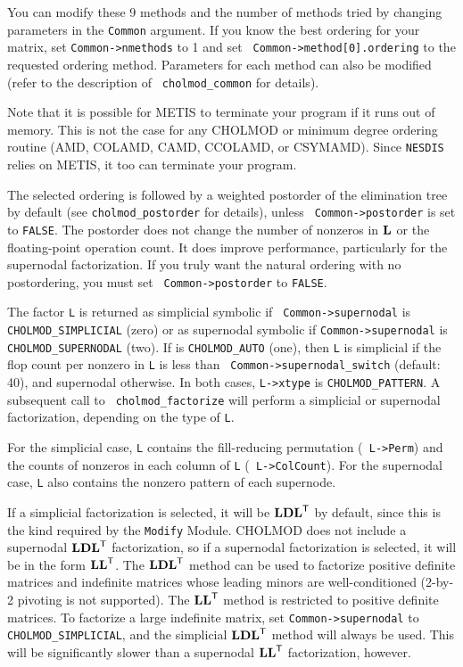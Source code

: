 \documentclass[11pt]{article}
\newcommand{\m}[1]{{\bf{#1}}}       %
\newcommand{\tr}{^{\sf T}}          %
\begin{document}
You can modify these 9 methods and the number of methods tried by changing
parameters in the {\tt Common} argument.  If you know the best ordering for
your matrix, set {\tt Common->nmethods} to 1 and set {\tt
Common->method[0].ordering} to the requested ordering method.  Parameters for
each method can also be modified (refer to the description of {\tt
cholmod\_common} for details).

Note that it is possible for METIS to terminate your program if it runs out of
memory.  This is not the case for any CHOLMOD or minimum degree ordering
routine (AMD, COLAMD, CAMD, CCOLAMD, or CSYMAMD).  Since {\tt NESDIS} relies on
METIS, it too can terminate your program.

The selected ordering is followed by a weighted postorder of the elimination
tree by default (see {\tt cholmod\_postorder} for details), unless {\tt
Common->postorder} is set to {\tt FALSE}.  The postorder does not change the
number of nonzeros in $\m{L}$ or the floating-point operation count.  It does
improve performance, particularly for the supernodal factorization.  If you
truly want the natural ordering with no postordering, you must set {\tt
Common->postorder} to {\tt FALSE}.

The factor {\tt L} is returned as simplicial symbolic if {\tt
Common->supernodal} is {\tt CHOLMOD\_SIMPLICIAL} (zero) or as supernodal
symbolic if {\tt Common->supernodal} is {\tt CHOLMOD\_SUPERNODAL} (two).  If
 is {\tt CHOLMOD\_AUTO} (one), then {\tt L} is
simplicial if the flop count per nonzero in {\tt L} is less than {\tt
Common->supernodal\_switch} (default: 40), and supernodal otherwise.  In both
cases, {\tt L->xtype} is {\tt CHOLMOD\_PATTERN}.  A subsequent call to {\tt
cholmod\_factorize} will perform a simplicial or supernodal factorization,
depending on the type of {\tt L}.

For the simplicial case, {\tt L} contains the fill-reducing permutation ({\tt
L->Perm}) and the counts of nonzeros in each column of {\tt L} ({\tt
L->ColCount}).  For the supernodal case, {\tt L} also contains the nonzero
pattern of each supernode.

If a simplicial factorization is selected, it will be $\m{LDL}\tr$ by default,
since this is the kind required by the {\tt Modify} Module.  CHOLMOD does not
include a supernodal $\m{LDL}\tr$ factorization, so if a supernodal
factorization is selected, it will be in the form $\m{LL}\tr$.  The
$\m{LDL}\tr$ method can be used to factorize positive definite matrices and
indefinite matrices whose leading minors are well-conditioned (2-by-2 pivoting
is not supported).  The $\m{LL}\tr$ method is restricted to positive definite
matrices.  To factorize a large indefinite matrix, set {\tt Common->supernodal}
to {\tt CHOLMOD\_SIMPLICIAL}, and the simplicial $\m{LDL}\tr$ method will
always be used.  This will be significantly slower than a supernodal
$\m{LL}\tr$ factorization, however.
\end{document}
